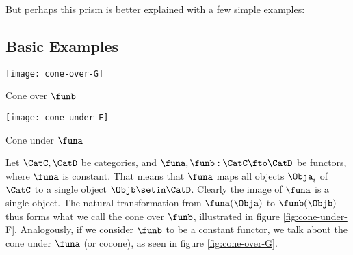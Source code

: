 \begin{figure*}[h]
    \centering
    \begin{ctdefinitionshade}
        \small
    \end{ctdefinitionshade}
    \caption{}
    \label{fig:nat_trans_graphically}
\end{figure*}

But perhaps this prism is better explained with a few simple examples:

\subsection{Basic Examples}

\begin{marginfigure}
    \centering
    \texttt{[image: cone-over-G]}
    \caption{Cone over $\funb$}
    \label{fig:cone-over-G}

\begin{marginfigure}
    \centering
    \texttt{[image: cone-under-F]}
    \label{fig:cone-under-F}
    \caption{Cone under $\funa$}
\end{marginfigure}

\end{marginfigure}
\begin{example}
Let $\CatC, \CatD$ be categories, and $\funa, \funb:\CatC\fto\CatD$ be functors, where $\funa$ is constant. That means that $\funa$ maps all objects $\Obja_i$ of $\CatC$ to a single object $\Objb \setin \CatD$. Clearly the image of $\funa$ is a single object. The natural transformation from $\funa(\Obja)$ to $\funb(\Objb)$ thus forms what we call the cone over $\funb$, illustrated in figure \cref{fig:cone-under-F}.
Analogously, if we consider $\funb$ to be a constant functor, we talk about the cone under $\funa$ (or cocone), as seen in figure \cref{fig:cone-over-G}.
\end{example}


